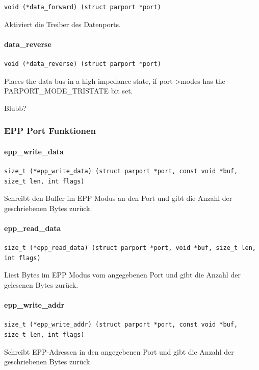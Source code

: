 \documentclass[a4paper,11pt]{article}
\begin{document}
\begin{verbatim}
void (*data_forward) (struct parport *port)
\end{verbatim}

Aktiviert die Treiber des Datenports.

\paragraph{data\_reverse}

\begin{verbatim}
void (*data_reverse) (struct parport *port)
\end{verbatim}

Places the data bus in a high impedance state, if port->modes has the
PARPORT\_MODE\_TRISTATE bit set.

Blubb?

\subsubsection{EPP Port Funktionen}

\paragraph{epp\_write\_data}
\begin{verbatim}
size_t (*epp_write_data) (struct parport *port, const void *buf, size_t len, int flags)
\end{verbatim}

Schreibt den Buffer im EPP Modus an den Port und gibt die Anzahl der geschriebenen Bytes zurück.

\paragraph{epp\_read\_data}
\begin{verbatim}
size_t (*epp_read_data) (struct parport *port, void *buf, size_t len, int flags)
\end{verbatim}
Liest Bytes im EPP Modus vom angegebenen Port und gibt die Anzahl der gelesenen Bytes zurück.

\paragraph{epp\_write\_addr}
\begin{verbatim}
size_t (*epp_write_addr) (struct parport *port, const void *buf, size_t len, int flags)
\end{verbatim}
Schreibt EPP-Adressen in den angegebenen Port und gibt die Anzahl der geschriebenen Bytes zurück.
\end{document}

